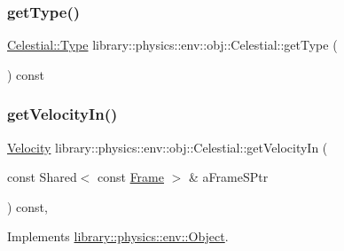 \subsubsection{\texorpdfstring{get\+Type()}{getType()}}
{\footnotesize\ttfamily \hyperlink{classlibrary_1_1physics_1_1env_1_1obj_1_1_celestial_aab1f58aa727e639288d65f3d33c4f245}{Celestial\+::\+Type} library\+::physics\+::env\+::obj\+::\+Celestial\+::get\+Type (\begin{DoxyParamCaption}{ }\end{DoxyParamCaption}) const}

\mbox{\label{classlibrary_1_1physics_1_1env_1_1obj_1_1_celestial_accaa3b1fdc39a1a058fd35006f31982d}} 
\subsubsection{\texorpdfstring{get\+Velocity\+In()}{getVelocityIn()}}
{\footnotesize\ttfamily \hyperlink{classlibrary_1_1physics_1_1coord_1_1_velocity}{Velocity} library\+::physics\+::env\+::obj\+::\+Celestial\+::get\+Velocity\+In (\begin{DoxyParamCaption}\item[{const Shared$<$ const \hyperlink{classlibrary_1_1physics_1_1coord_1_1_frame}{Frame} $>$ \&}]{a\+Frame\+S\+Ptr }\end{DoxyParamCaption}) const\hspace{0.3cm}{\ttfamily [override]}, {\ttfamily [virtual]}}



Implements \hyperlink{classlibrary_1_1physics_1_1env_1_1_object_a1a8f4358db37b1b8830866373f8f3670}{library\+::physics\+::env\+::\+Object}.

\mbox{\label{classlibrary_1_1physics_1_1env_1_1obj_1_1_celestial_a2b16a76f609891450356457de13c26d8}} 
